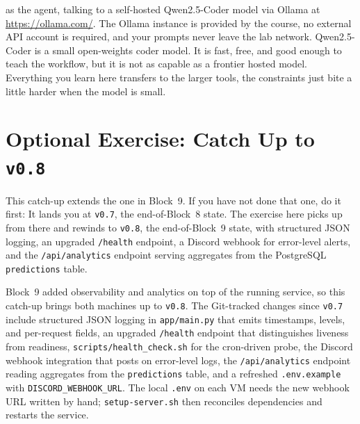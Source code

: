 
 as the agent, talking to a self-hosted Qwen2.5-Coder model via
Ollama at \url{https://ollama.com/}. The Ollama instance is provided by the course,
no external API account is required, and your prompts never leave the lab network. Qwen2.5-Coder is
a small open-weights coder model. It is fast, free, and good enough to teach the workflow, but it is
not as capable as a frontier hosted model. Everything you learn here transfers to the larger tools,
the constraints just bite a little harder when the model is small.

\newpage
\section{Optional Exercise: Catch Up to \texttt{v0.8}}


This catch-up extends the one in Block~9. If you have not done that one,
do it first: It lands you at \texttt{v0.7}, the end-of-Block~8 state.
The exercise here picks up from there and rewinds to \texttt{v0.8}, the
end-of-Block~9 state, with structured JSON logging, an upgraded
\texttt{/health} endpoint, a Discord webhook for error-level alerts,
and the \texttt{/api/analytics} endpoint serving aggregates from the
PostgreSQL \texttt{predictions} table.

 Block~9 added observability and
analytics on top of the running service, so this catch-up brings both
machines up to \texttt{v0.8}. The Git-tracked changes since \texttt{v0.7}
include structured JSON logging in \texttt{app/main.py} that emits
timestamps, levels, and per-request fields, an upgraded \texttt{/health}
endpoint that distinguishes liveness from readiness,
\texttt{scripts/health\_check.sh} for the cron-driven probe, the Discord
webhook integration that posts on error-level logs, the
\texttt{/api/analytics} endpoint reading aggregates from the
\texttt{predictions} table, and a refreshed \texttt{.env.example} with
\texttt{DISCORD\_WEBHOOK\_URL}. The local \texttt{.env} on each VM needs
the new webhook URL written by hand; \texttt{setup-server.sh} then
reconciles dependencies and restarts the service.

